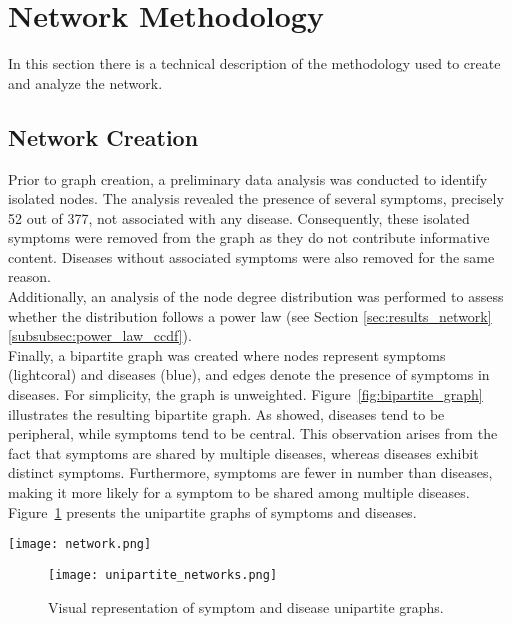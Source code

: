 \section{Network Methodology}
In this section there is a technical description of the methodology used to create and analyze the network.

\subsection{Network Creation}
Prior to graph creation, a preliminary data analysis was conducted to identify isolated nodes.
The analysis revealed the presence of several symptoms, precisely 52 out of 377, not associated with any disease.
Consequently, these isolated symptoms were removed from the graph as they do not contribute informative content.
Diseases without associated symptoms were also removed for the same reason.\\
Additionally, an analysis of the node degree distribution was performed to assess whether the distribution follows
a power law (see Section \ref{sec:results_network}\ref{subsubsec:power_law_ccdf}).\\
Finally, a bipartite graph was created where nodes represent symptoms (lightcoral) and diseases (blue),
and edges denote the presence of symptoms in diseases.
For simplicity, the graph is unweighted.
Figure~\ref{fig:bipartite_graph} illustrates the resulting bipartite graph. As showed, diseases tend to be peripheral,
while symptoms tend to be central. This observation arises from the fact that symptoms are shared by multiple diseases,
whereas diseases exhibit distinct symptoms. Furthermore, symptoms are fewer in number than diseases,
making it more likely for a symptom to be shared among multiple diseases.\\
Figure~\ref{fig:unipartite_graphs} presents the unipartite graphs of symptoms and diseases.
\begin{figure*}[thbp]
    \centering
    \texttt{[image: network.png]}
    \caption{Visual representation of the symptom-disease bipartite graph.}\label{fig:bipartite_graph}
\end{figure*}
\noindent

\begin{figure}[H]
    \centering
    \texttt{[image: unipartite\_networks.png]}
    \caption{Visual representation of symptom and disease unipartite graphs.}\label{fig:unipartite_graphs}
\end{figure}
\noindent

